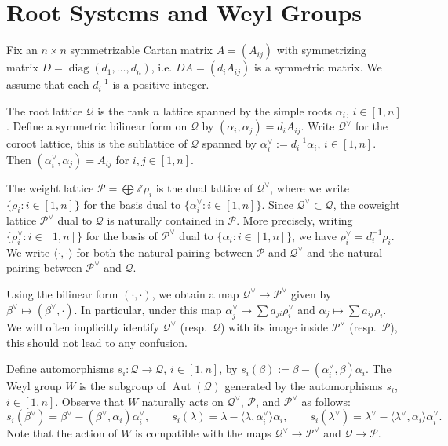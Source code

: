 \documentclass{amsart}
\numberwithin{theorem}{section}
\newcommand{\cP}{\mathcal{P}}
\newcommand{\cQ}{\mathcal{Q}}
\newcommand{\ZZ}{\mathbb{Z}}
\newcommand{\Aut}{\operatorname{Aut}}
\newcommand{\diag}{\operatorname{diag}}
\begin{document}
  \section{Root Systems and Weyl Groups}
    Fix an $n\times n$ symmetrizable Cartan matrix $A=(A_{ij})$ with symmetrizing matrix $D=\diag(d_1,\ldots,d_n)$, i.e. $DA=(d_iA_{ij})$ is a symmetric matrix.
    We assume that each $d_i^{-1}$ is a positive integer.

    The root lattice $\cQ$ is the rank $n$ lattice spanned by the simple roots $\alpha_i$, $i\in[1,n]$.
    Define a symmetric bilinear form on $\cQ$ by $(\alpha_i,\alpha_j)=d_iA_{ij}$.
    Write $\cQ^\vee$ for the coroot lattice, this is the sublattice of $\cQ$ spanned by $\alpha_i^\vee:=d_i^{-1}\alpha_i$, $i\in[1,n]$.
    Then $(\alpha_i^\vee,\alpha_j)=A_{ij}$ for $i,j\in[1,n]$.

    The weight lattice $\cP=\bigoplus\ZZ\rho_i$ is the dual lattice of $\cQ^\vee$, where we write $\{\rho_i:i\in[1,n]\}$ for the basis dual to $\{\alpha_i^\vee:i\in[1,n]\}$.
    Since $\cQ^\vee\subset\cQ$, the coweight lattice $\cP^\vee$ dual to $\cQ$ is naturally contained in $\cP$.
    More precisely, writing $\{\rho_i^\vee:i\in[1,n]\}$ for the basis of $\cP^\vee$ dual to $\{\alpha_i:i\in[1,n]\}$, we have $\rho_i^\vee=d_i^{-1}\rho_i$.
    We write $\langle\cdot,\cdot\rangle$ for both the natural pairing between $\cP$ and $\cQ^\vee$ and the natural pairing between $\cP^\vee$ and $\cQ$.

    Using the bilinear form $(\cdot,\cdot)$, we obtain a map $\cQ^\vee\to\cP^\vee$ given by $\beta^\vee\mapsto (\beta^\vee,\cdot)$.
    In particular, under this map $\alpha_j^\vee\mapsto \sum a_{ji}\rho_i^\vee$ and $\alpha_j\mapsto \sum a_{ij}\rho_i$.
    We will often implicitly identify $\cQ^\vee$ (resp.\ $\cQ$) with its image inside $\cP^\vee$ (resp.\ $\cP$), this should not lead to any confusion.

    Define automorphisms $s_i:\cQ\to\cQ$, $i\in[1,n]$, by $s_i(\beta):=\beta-(\alpha_i^\vee,\beta)\alpha_i$.
    The Weyl group $W$ is the subgroup of $\Aut(\cQ)$ generated by the automorphisms $s_i$, $i\in[1,n]$.
    Observe that $W$ naturally acts on $\cQ^\vee$, $\cP$, and $\cP^\vee$ as follows:
    \[s_i(\beta^\vee)=\beta^\vee-(\beta^\vee,\alpha_i)\alpha_i^\vee,\qquad s_i(\lambda)=\lambda-\langle\lambda,\alpha_i^\vee\rangle\alpha_i,\qquad s_i(\lambda^\vee)=\lambda^\vee-\langle\lambda^\vee,\alpha_i\rangle\alpha_i^\vee.\]
    Note that the action of $W$ is compatible with the maps $\cQ^\vee\to\cP^\vee$ and $\cQ\to\cP$.
\end{document}
